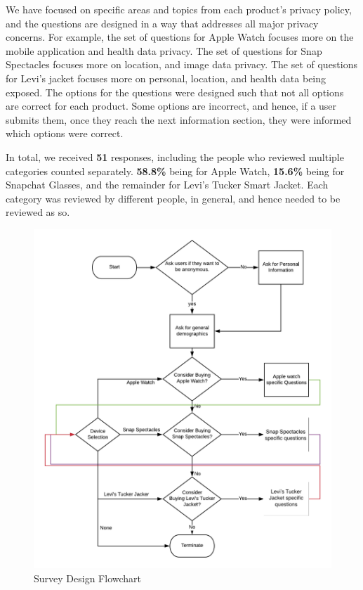 \documentclass[sigconf]{acmart}
\begin{document}
We have focused on specific areas and topics from each product’s privacy policy, and the questions are designed in a way that addresses all major privacy concerns. For example, the set of questions for Apple Watch focuses more on the mobile application and health data privacy. The set of questions for Snap Spectacles focuses more on location, and image data privacy. The set of questions for Levi’s jacket focuses more on personal, location, and health data being exposed. The options for the questions were designed such that not all options are correct for each product. Some options are incorrect, and hence, if a user submits them, once they reach the next information section, they were informed which options were correct.

In total, we received \textbf{51} responses, including the people who reviewed multiple categories counted separately. \textbf{58.8\%} being for Apple Watch, \textbf{15.6\%} being for Snapchat Glasses, and the remainder for Levi’s Tucker Smart Jacket. Each category was reviewed by different people, in general, and hence needed to be reviewed as so.

\begin{figure}[h]
  \centering
  \includegraphics[width=\linewidth]{Flowchart_privacyProject.png}
  \caption{Survey Design Flowchart}
  \label{flowchart}
\end{figure}
\end{document}
